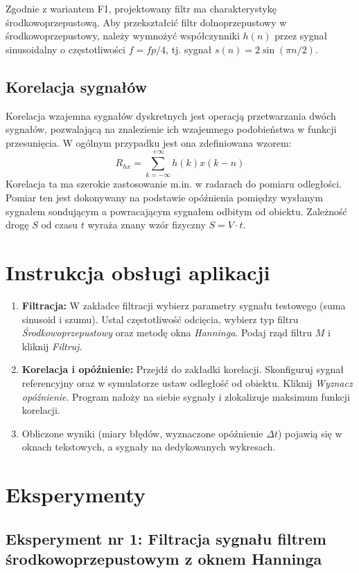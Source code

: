 \documentclass[12pt]{article}
\begin{document}
Zgodnie z wariantem F1, projektowany filtr ma charakterystykę środkowoprzepustową. Aby przekształcić filtr dolnoprzepustowy w środkowoprzepustowy, należy wymnożyć współczynniki $h(n)$ przez sygnał sinusoidalny o częstotliwości $f=fp/4$, tj. sygnał $s(n)=2\sin(\pi n/2)$.

\subsection{Korelacja sygnałów}
Korelacja wzajemna sygnałów dyskretnych jest operacją przetwarzania dwóch sygnałów, pozwalającą na znalezienie ich wzajemnego podobieństwa w funkcji przesunięcia. W ogólnym przypadku jest ona zdefiniowana wzorem:
$$R_{hx} = \sum_{k=-\infty}^{+\infty} h(k)x(k-n)$$ 
Korelacja ta ma szerokie zastosowanie m.in. w radarach do pomiaru odległości. Pomiar ten jest dokonywany na podstawie opóźnienia pomiędzy wysłanym sygnałem sondującym a powracającym sygnałem odbitym od obiektu. Zależność drogę $S$ od czasu $t$ wyraża znany wzór fizyczny $S = V \cdot t$.

\section{Instrukcja obsługi aplikacji}
\begin{enumerate}
    \item \textbf{Filtracja:} W zakładce filtracji wybierz parametry sygnału testowego (suma sinusoid i szumu). Ustal częstotliwość odcięcia, wybierz typ filtru \textit{Środkowoprzepustowy} oraz metodę okna \textit{Hanninga}. Podaj rząd filtru $M$ i kliknij \textit{Filtruj}.
    \item \textbf{Korelacja i opóźnienie:} Przejdź do zakładki korelacji. Skonfiguruj sygnał referencyjny oraz w symulatorze ustaw odległość od obiektu. Kliknij \textit{Wyznacz opóźnienie}. Program nałoży na siebie sygnały i zlokalizuje maksimum funkcji korelacji.
    \item Obliczone wyniki (miary błędów, wyznaczone opóźnienie $\Delta t$) pojawią się w oknach tekstowych, a sygnały na dedykowanych wykresach.
\end{enumerate}

\section{Eksperymenty}

\subsection{Eksperyment nr 1: Filtracja sygnału filtrem środkowoprzepustowym z oknem Hanninga}
\end{document}

